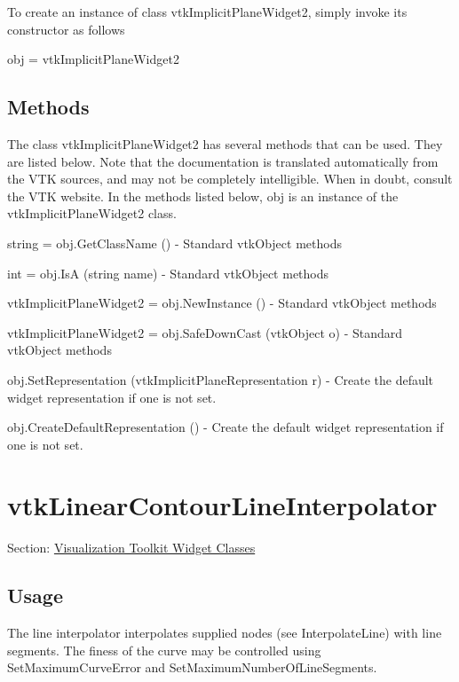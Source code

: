 To create an instance of class vtk\-Implicit\-Plane\-Widget2, simply invoke its constructor as follows \begin{DoxyVerb}  obj = vtkImplicitPlaneWidget2
\end{DoxyVerb}
 \hypertarget{vtkwidgets_vtkxyplotwidget_Methods}{}\subsection{Methods}\label{vtkwidgets_vtkxyplotwidget_Methods}
The class vtk\-Implicit\-Plane\-Widget2 has several methods that can be used. They are listed below. Note that the documentation is translated automatically from the V\-T\-K sources, and may not be completely intelligible. When in doubt, consult the V\-T\-K website. In the methods listed below, {\ttfamily obj} is an instance of the vtk\-Implicit\-Plane\-Widget2 class. 
\begin{DoxyItemize}
\item {\ttfamily string = obj.\-Get\-Class\-Name ()} -\/ Standard vtk\-Object methods  
\item {\ttfamily int = obj.\-Is\-A (string name)} -\/ Standard vtk\-Object methods  
\item {\ttfamily vtk\-Implicit\-Plane\-Widget2 = obj.\-New\-Instance ()} -\/ Standard vtk\-Object methods  
\item {\ttfamily vtk\-Implicit\-Plane\-Widget2 = obj.\-Safe\-Down\-Cast (vtk\-Object o)} -\/ Standard vtk\-Object methods  
\item {\ttfamily obj.\-Set\-Representation (vtk\-Implicit\-Plane\-Representation r)} -\/ Create the default widget representation if one is not set.  
\item {\ttfamily obj.\-Create\-Default\-Representation ()} -\/ Create the default widget representation if one is not set.  
\end{DoxyItemize}\hypertarget{vtkwidgets_vtklinearcontourlineinterpolator}{}\section{vtk\-Linear\-Contour\-Line\-Interpolator}\label{vtkwidgets_vtklinearcontourlineinterpolator}
Section\-: \hyperlink{sec_vtkwidgets}{Visualization Toolkit Widget Classes} \hypertarget{vtkwidgets_vtkxyplotwidget_Usage}{}\subsection{Usage}\label{vtkwidgets_vtkxyplotwidget_Usage}
The line interpolator interpolates supplied nodes (see Interpolate\-Line) with line segments. The finess of the curve may be controlled using Set\-Maximum\-Curve\-Error and Set\-Maximum\-Number\-Of\-Line\-Segments.

